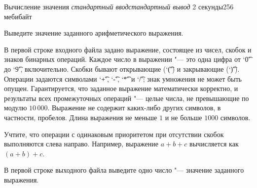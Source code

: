 
\begin{problem}{Вычисление значения}
{\textsl{стандартный ввод}}{\textsl{стандартный вывод}}
{2 секунды}{256 мебибайт}{}

Выведите значение заданного арифметического выражения.

\InputFile

В первой строке входного файла задано выражение, состоящее из
чисел, скобок и знаков бинарных операций. Каждое число в выражении "---
это одна цифра от `\t{0}' до `\t{9}', включительно.
Скобки бывают открывающие (`\t{(}') и закрывающие (`\t{)}').
Операции задаются символами `\t{+}', `\t{-}', `\t{*}' и `\t{/}';
знак умножения не может быть опущен.
Гарантируется, что заданное выражение математически корректно,
и результаты всех промежуточных операций "--- целые числа,
не превышающие по модулю $10\,000$.
Выражение не содержит каких-либо других символов, в частности,
пробелов. Длина выражения не меньше $1$ и не больше $1000$ символов.

Учтите, что операции с одинаковым приоритетом при отсутствии скобок
выполняются слева направо. Например, выражение $a + b + c$ вычисляется
как $(a + b) + c$.

\OutputFile

В первой строке выходного файла выведите одно число "--- значение
заданного выражения.

\Examples

\begin{example}
%
%
\end{example}

\end{problem}
